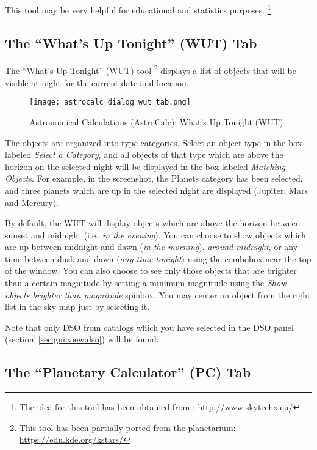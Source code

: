 This tool may be very helpful for educational and statistics purposes.%
	\footnote{The idea for this tool has been obtained from : \url{http://www.skytechx.eu/}}

\subsection{The ``What's Up Tonight'' (WUT) Tab}
\label{sec:gui:AstroCalc:WUT}

The ``What's Up Tonight'' (WUT) tool%
	\footnote{This tool has been partially ported from the  planetarium: \url{https://edu.kde.org/kstars/}}
 displays a list of objects that will be visible at night for the current date and location.

\begin{figure}[htbp]
\centering\texttt{[image: astrocalc\_dialog\_wut\_tab.png]}
\caption{Astronomical Calculations (AstroCalc): What's Up Tonight (WUT)}
\label{fig:gui:AstroCalc:WUT}
\end{figure}

The objects are organized into type categories. Select an object type in the box labeled 
\emph{Select a Category}, and all objects of that type which are above the horizon on the selected night 
will be displayed in the box labeled \emph{Matching Objects}. For example, in the screenshot, 
the Planets category has been selected, and three planets which are up in the selected night are displayed (Jupiter, Mars and Mercury). 

By default, the WUT will display objects which are above the horizon between sunset and midnight (i.e.\ \emph{in the evening}). 
You can choose to show objects which are up between midnight and dawn (\emph{in the morning}), 
\emph{around midnight}, 
or any time between dusk and dawn (\emph{any time tonight}) using the combobox near the top of the window. 
You can also choose to see only those objects that are brighter than a certain magnitude by 
setting a minimum magnitude using the \emph{Show objects brighter than magnitude} spinbox. 
You may center an object from the right list in the sky map just by selecting it.

Note that only DSO from catalogs which you have selected in the DSO panel (section~\ref{sec:gui:view:dso}) will be found.

\subsection{The ``Planetary Calculator'' (PC) Tab}
\label{sec:gui:AstroCalc:PC}

